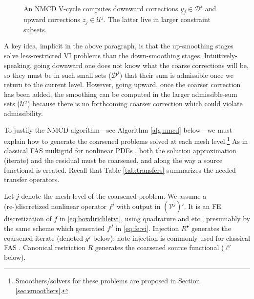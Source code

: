 \documentclass[letterpaper,final,12pt,reqno]{amsart}
\theoremstyle{cstyle}
\theoremstyle{cstyle*}
\theoremstyle{dstyle}
\numberwithin{equation}{section}
\numberwithin{figure}{section}
\numberwithin{table}{section}
\numberwithin{theorem}{section}
\newcommand{\cV}{\mathcal{V}}
\newcommand{\iR}{R^{\bullet}}
\begin{document}
\begin{figure}[ht]
\begin{center}

\end{center}
\caption{An NMCD V-cycle computes downward corrections $y_j \in \mathcal{D}^j$ and upward corrections $z_j\in\mathcal{U}^j$.  The latter live in larger constraint subsets.}
\label{fig:nmcdvcycle}
\end{figure}

A key idea, implicit in the above paragraph, is that the up-smoothing stages solve less-restricted VI problems than the down-smoothing stages.  Intuitively-speaking, going downward one does not know what the coarse corrections will be, so they must be in such small sets ($\mathcal{D}^j$) that their sum is admissible once we return to the current level.  However, going upward, once the coarser correction has been added, the smoothing can be computed in the larger admissible-sum sets ($\mathcal{U}^j$) because there is no forthcoming coarser correction which could violate admissibility.

To justify the NMCD algorithm---see Algorithm \ref{alg:nmcd} below---we must explain how to generate the coarsened problems solved at each mesh level.\footnote{Smoothers/solvers for these problems are proposed in Section \ref{sec:smoothers}.}  As in classical FAS multigrid for nonlinear PDEs \cite{BrandtLivne2011,Bruneetal2015,Trottenbergetal2001}, both the solution approximation (iterate) and the residual must be coarsened, and along the way a source functional is created.  Recall that Table \ref{tab:transfers} summarizes the needed transfer operators.

Let $j$ denote the mesh level of the coarsened problem.  We assume a (re-)discretized nonlinear operator $f^j$ with output in $(\cV^j)'$.  It is an FE discretization of $f$ in \eqref{eq:boxdirichletvi}, using quadrature and etc., presumably by the same scheme which generated $f^J$ in \eqref{eq:fe:vi}.  Injection $\iR$ generates the coarsened iterate (denoted $g^j$ below); note injection is commonly used for classical FAS \cite[section 5.3]{Trottenbergetal2001}.  Canonical restriction $R$ generates the coarsened source functional ($\ell^j$ below).
\end{document}
